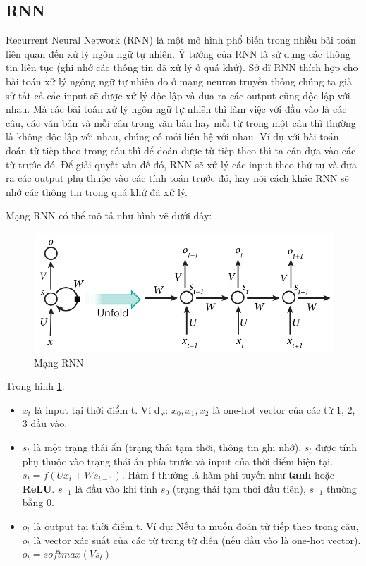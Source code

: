 \documentclass[a4paper,12pt]{report}
\begin{document}
\subsection{RNN}
Recurrent Neural Network (RNN) là một mô hình phổ biến trong nhiều bài toán liên quan đến xử lý ngôn ngữ tự nhiên. Ý tưởng của RNN là sử dụng các thông tin liên tục (ghi nhớ các thông tin đã xử lý ở quá khứ). Sở dĩ RNN thích hợp cho bài toán xử lý ngông ngữ tự nhiên do ở mạng neuron truyền thống chúng ta giả sử tất cả các input sẽ được xử lý độc lập và đưa ra các output cũng độc lập với nhau. Mà các bài toán xử lý ngôn ngữ tự nhiên thì làm việc với đầu vào là các câu, các văn bản và mỗi câu trong văn bản hay mỗi từ trong một câu thì thường là không độc lập với nhau, chúng có mỗi liên hệ với nhau. Ví dụ với bài toán đoán từ tiếp theo trong câu thì để đoán được từ tiếp theo thì ta cần dựa vào các từ trước đó. Để giải quyết vấn đề đó, RNN sẽ xử lý các input theo thứ tự và đưa ra các output phụ thuộc vào các tính toán trước đó, hay nói cách khác RNN sẽ nhớ các thông tin trong quá khứ đã xử lý.
\par Mạng RNN có thể mô tả như hình vẽ dưới đây: 
\begin{figure}[H]
\centering
\includegraphics[scale=0.5]{rnn.jpg}
\caption{Mạng RNN}
\label{img_rnn}
\end{figure}
Trong hình \ref{img_rnn}:
\begin{itemize}
\item $x_t$ là input tại thời điểm t. Ví dụ: $x_0, x_1, x_2$ là one-hot vector của các từ 1, 2, 3 đầu vào.
\item $s_t$ là một trạng thái ẩn (trạng thái tạm thời, thông tin ghi nhớ). $s_t$ được tính phụ thuộc vào trạng thái ẩn phía trước và input của thời điểm hiện tại. $s_t = f(Ux_t + Ws_{t-1})$. Hàm f thường là hàm phi tuyến như \textbf{tanh} hoặc \textbf{ReLU}. $s_{-1}$ là đầu vào khi tính $s_0$ (trạng thái tạm thời đầu tiên), $s_{-1}$ thường bằng 0.
\item $o_t$ là output tại thời điểm t. Ví dụ: Nếu ta muốn đoán từ tiếp theo trong câu, $o_t$ là vector xác suất của các từ trong từ điển (nếu đầu vào là one-hot vector). $o_t = softmax(Vs_t)$
\end{itemize}
\end{document}
